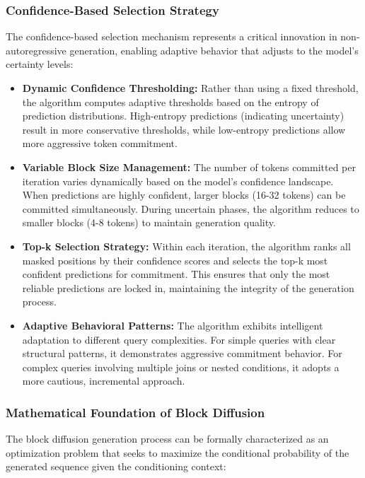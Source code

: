 \documentclass[a4paper,12pt]{article}
\begin{document}
\subsubsection*{Confidence-Based Selection Strategy}
The confidence-based selection mechanism represents a critical innovation in non-autoregressive generation, enabling adaptive behavior that adjusts to the model's certainty levels:

\begin{itemize}
    \item \textbf{Dynamic Confidence Thresholding:} Rather than using a fixed threshold, the algorithm computes adaptive thresholds based on the entropy of prediction distributions. High-entropy predictions (indicating uncertainty) result in more conservative thresholds, while low-entropy predictions allow more aggressive token commitment.
    
    \item \textbf{Variable Block Size Management:} The number of tokens committed per iteration varies dynamically based on the model's confidence landscape. When predictions are highly confident, larger blocks (16-32 tokens) can be committed simultaneously. During uncertain phases, the algorithm reduces to smaller blocks (4-8 tokens) to maintain generation quality.
    
    \item \textbf{Top-k Selection Strategy:} Within each iteration, the algorithm ranks all masked positions by their confidence scores and selects the top-k most confident predictions for commitment. This ensures that only the most reliable predictions are locked in, maintaining the integrity of the generation process.
    
    \item \textbf{Adaptive Behavioral Patterns:} The algorithm exhibits intelligent adaptation to different query complexities. For simple queries with clear structural patterns, it demonstrates aggressive commitment behavior. For complex queries involving multiple joins or nested conditions, it adopts a more cautious, incremental approach.
\end{itemize}

\subsubsection*{Mathematical Foundation of Block Diffusion}
The block diffusion generation process can be formally characterized as an optimization problem that seeks to maximize the conditional probability of the generated sequence given the conditioning context:
\end{document}
